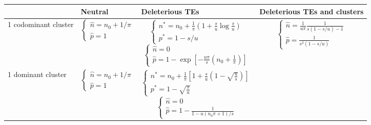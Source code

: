 \documentclass[10pt,a4paper]{article}
\begin{document}
\begin{table}
\begin{adjustwidth}{-2in}{0in}
\begin{flushright}
\begin{tabular}{lp{4cm}p{4cm}p{4cm}}
 & Neutral & Deleterious TEs & Deleterious TEs and clusters \\ \hline
1 codominant cluster 		& \begin{equation*}\begin{cases} \hat n = n_0 + 1/\pi \\ \hat p = 1 \end{cases}\end{equation*} 
							& \begin{equation*}\begin{cases} n^\ast = n_0 + \frac{1}{\pi}(1+ \frac{s}{u}\log \frac{s}{u}) \\ p^\ast = 1 - s/u \end{cases}\end{equation*}
							\begin{equation*}\begin{cases} \hat n = 0 \\ \hat p = 1 - \exp[-\frac{u\pi}{s}(n_0+\frac{1}{\pi})] \end{cases}\end{equation*} 
							& \begin{equation*}\begin{cases} \hat n =\frac{1}{u \pi} \frac{1}{s(1-s/u)-1} \\ \hat p = \frac{1}{s^2(1-s/u)} \end{cases}\end{equation*}  \\
1 dominant cluster 			& \begin{equation*}\begin{cases} \hat n = n_0 + 1/\pi \\ \hat p = 1 \end{cases}\end{equation*} 
							& \begin{equation*}\begin{cases} n^\ast = n_0 + \frac{1}{\pi}[1+ \frac{s}{u}(1-\sqrt{\frac{u}{s}})] \\ p^\ast = 1 - \sqrt{\frac{s}{u}} \end{cases}\end{equation*}
							\begin{equation*}\begin{cases} \hat n = 0 \\ \hat p = 1-\frac{1}{1-u(n_0 \pi + 1)/s} \end{cases}\end{equation*} 

\end{tabular}
\end{flushright}
\end{adjustwidth}
\end{table}
\end{document}
